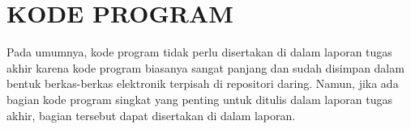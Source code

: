 \cleardoublepage
\chapter{KODE PROGRAM}
Pada umumnya, kode program tidak perlu disertakan di dalam laporan tugas akhir karena kode program biasanya sangat panjang
dan sudah disimpan dalam bentuk berkas-berkas elektronik terpisah di repositori daring. 
Namun, jika ada bagian kode program singkat yang penting untuk ditulis dalam laporan tugas akhir, 
bagian tersebut dapat disertakan di dalam laporan.